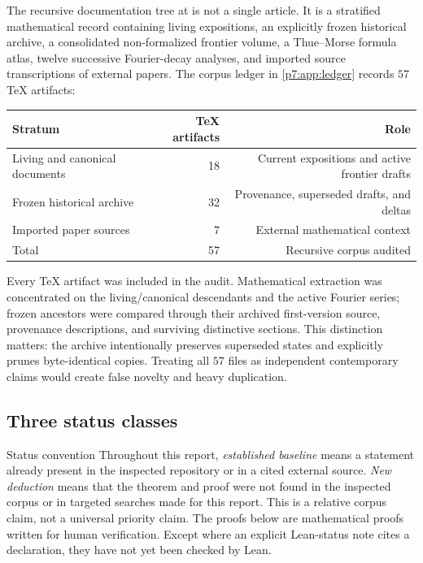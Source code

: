 \documentclass[11pt]{article}
\numberwithin{equation}{section}
\theoremstyle{definition}
\theoremstyle{remark}
\begin{document}
The recursive documentation tree at \CorpusURL{} is not a single article.  It is a stratified mathematical record containing living expositions, an explicitly frozen historical archive, a consolidated non-formalized frontier volume, a Thue--Morse formula atlas, twelve successive Fourier-decay analyses, and imported source transcriptions of external papers.  The corpus ledger in \cref{p7:app:ledger} records $57$ TeX artifacts:
\begin{center}
\begin{tabular}{@{}lrr@{}}
\toprule
Stratum & TeX artifacts & Role\\
\midrule
Living and canonical documents & 18 & Current expositions and active frontier drafts\\
Frozen historical archive & 32 & Provenance, superseded drafts, and deltas\\
Imported paper sources & 7 & External mathematical context\\
\midrule
Total & 57 & Recursive corpus audited\\
\bottomrule
\end{tabular}
\end{center}

Every TeX artifact was included in the audit.  Mathematical extraction was concentrated on the living/canonical descendants and the active Fourier series; frozen ancestors were compared through their archived first-version source, provenance descriptions, and surviving distinctive sections.  This distinction matters: the archive intentionally preserves superseded states and explicitly prunes byte-identical copies.  Treating all $57$ files as independent contemporary claims would create false novelty and heavy duplication.

\subsection{Three status classes}

\begin{statusboxPartxx}{Status convention}
Throughout this report, \emph{established baseline} means a statement already present in the inspected repository or in a cited external source.  \emph{New deduction} means that the theorem and proof were not found in the inspected corpus or in targeted searches made for this report.  This is a relative corpus claim, not a universal priority claim.  The proofs below are mathematical proofs written for human verification.  Except where an explicit Lean-status note cites a declaration, they have not yet been checked by Lean.
\end{statusboxPartxx}
\end{document}
